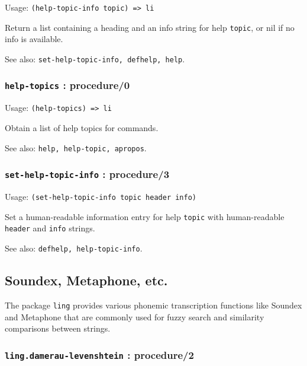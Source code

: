 \documentclass[
]{article}
\newcommand{\passthrough}[1]{#1}
\begin{document}
Usage: \passthrough{\lstinline!(help-topic-info topic) => li!}

Return a list containing a heading and an info string for help
\passthrough{\lstinline!topic!}, or nil if no info is available.

See also: \passthrough{\lstinline!set-help-topic-info, defhelp, help!}.

\hypertarget{help-topics-procedure0}{%
\subsubsection{\texorpdfstring{\texttt{help-topics} :
procedure/0}{help-topics : procedure/0}}\label{help-topics-procedure0}}

Usage: \passthrough{\lstinline!(help-topics) => li!}

Obtain a list of help topics for commands.

See also: \passthrough{\lstinline!help, help-topic, apropos!}.

\hypertarget{set-help-topic-info-procedure3}{%
\subsubsection{\texorpdfstring{\texttt{set-help-topic-info} :
procedure/3}{set-help-topic-info : procedure/3}}\label{set-help-topic-info-procedure3}}

Usage: \passthrough{\lstinline!(set-help-topic-info topic header info)!}

Set a human-readable information entry for help
\passthrough{\lstinline!topic!} with human-readable
\passthrough{\lstinline!header!} and \passthrough{\lstinline!info!}
strings.

See also: \passthrough{\lstinline!defhelp, help-topic-info!}.

\hypertarget{soundex-metaphone-etc.}{%
\subsection{Soundex, Metaphone, etc.}\label{soundex-metaphone-etc.}}

The package \passthrough{\lstinline!ling!} provides various phonemic
transcription functions like Soundex and Metaphone that are commonly
used for fuzzy search and similarity comparisons between strings.

\hypertarget{ling.damerau-levenshtein-procedure2}{%
\subsubsection{\texorpdfstring{\texttt{ling.damerau-levenshtein} :
procedure/2}{ling.damerau-levenshtein : procedure/2}}\label{ling.damerau-levenshtein-procedure2}}
\end{document}
